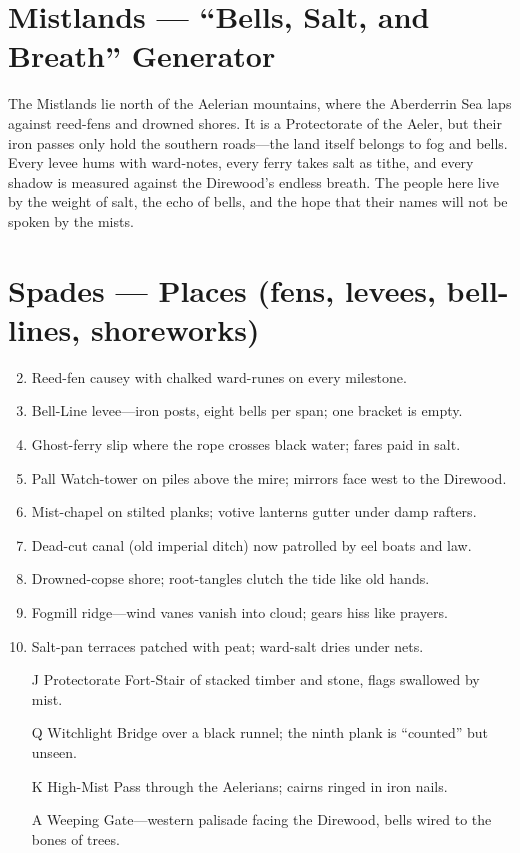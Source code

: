 \section{Mistlands --- ``Bells, Salt, and Breath'' Generator}
\label{chap:mistlands}

The Mistlands lie north of the Aelerian mountains, where the Aberderrin Sea laps against reed-fens and drowned shores. It is a Protectorate of the Aeler, but their iron passes only hold the southern roads---the land itself belongs to fog and bells. Every levee hums with ward-notes, every ferry takes salt as tithe, and every shadow is measured against the Direwood's endless breath. The people here live by the weight of salt, the echo of bells, and the hope that their names will not be spoken by the mists.

\section*{Spades --- Places (fens, levees, bell-lines, shoreworks)}
\label{sec:mistlands-places}
\begin{enumerate}
\setcounter{enumi}{1}
\item Reed-fen causey with chalked ward-runes on every milestone.
\item Bell-Line levee---iron posts, eight bells per span; one bracket is empty.
\item Ghost-ferry slip where the rope crosses black water; fares paid in salt.
\item Pall Watch-tower on piles above the mire; mirrors face west to the Direwood.
\item Mist-chapel on stilted planks; votive lanterns gutter under damp rafters.
\item Dead-cut canal (old imperial ditch) now patrolled by eel boats and law.
\item Drowned-copse shore; root-tangles clutch the tide like old hands.
\item Fogmill ridge---wind vanes vanish into cloud; gears hiss like prayers.
\item Salt-pan terraces patched with peat; ward-salt dries under nets.
\item[J] Protectorate Fort-Stair of stacked timber and stone, flags swallowed by mist.
\item[Q] Witchlight Bridge over a black runnel; the ninth plank is ``counted'' but unseen.
\item[K] High-Mist Pass through the Aelerians; cairns ringed in iron nails.
\item[A] Weeping Gate---western palisade facing the Direwood, bells wired to the bones of trees.
\end{enumerate}

